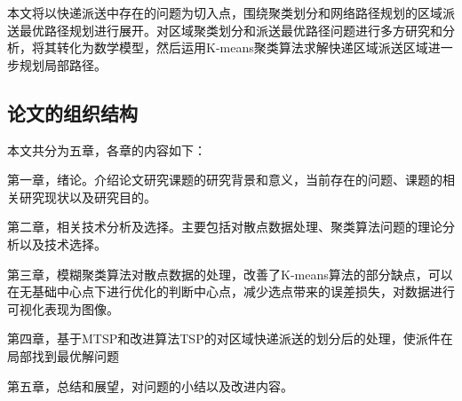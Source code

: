 本文将以快递派送中存在的问题为切入点，围绕聚类划分和网络路径规划的区域派送最优路径规划进行展开。对区域聚类划分和派送最优路径问题进行多方研究和分析，将其转化为数学模型，然后运用K-means聚类算法求解快递区域派送区域进一步规划局部路径。

\subsection{论文的组织结构}
\par 本文共分为五章，各章的内容如下： 
\par 第一章，绪论。介绍论文研究课题的研究背景和意义，当前存在的问题、课题的相关研究现状以及研究目的。
\par 第二章，相关技术分析及选择。主要包括对散点数据处理、聚类算法问题的理论分析以及技术选择。
\par 第三章，模糊聚类算法对散点数据的处理，改善了K-means算法的部分缺点，可以在无基础中心点下进行优化的判断中心点，减少选点带来的误差损失，对数据进行可视化表现为图像。
\par 第四章，基于MTSP和改进算法TSP的对区域快递派送的划分后的处理，使派件在局部找到最优解问题
\par 第五章，总结和展望，对问题的小结以及改进内容。
